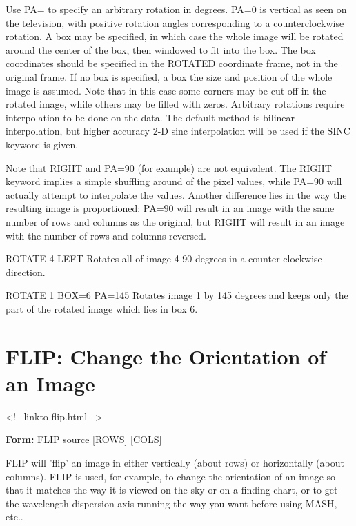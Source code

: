 Use PA= to specify an arbitrary rotation in degrees.  PA=0 is vertical as
seen on the television, with positive rotation angles corresponding to a
counterclockwise rotation. A box may be specified, in which case the whole
image will be rotated around the center of the box, then windowed to fit
into the box.  The box coordinates should be specified in the ROTATED
coordinate frame, not in the original frame. If no box is specified, a box
the size and position of the whole image is assumed.  Note that in this
case some corners may be cut off in the rotated image, while others may be
filled with zeros. Arbitrary rotations require interpolation to be done on
the data. The default method is bilinear interpolation, but higher accuracy
2-D sinc interpolation will be used if the SINC keyword is given.

Note that RIGHT and PA=90 (for example) are not equivalent.  The RIGHT
keyword implies a simple shuffling around of the pixel values, while PA=90
will actually attempt to interpolate the values.  Another difference lies
in the way the resulting image is proportioned: PA=90 will result in an
image with the same number of rows and columns as the original, but RIGHT
will result in an image with the number of rows and columns reversed.
\begin{example}
  \item[ROTATE 4 LEFT\hfill]{Rotates all of image 4 90 degrees
       in a counter-clockwise direction.}
  \item[ROTATE 1 BOX=6 PA=145\hfill]{Rotates image 1 by 145 degrees and
       keeps only the part of the rotated image which lies in box 6.}
\end{example}

\section{FLIP: Change the Orientation of an Image}
\begin{rawhtml}
<!-- linkto flip.html -->
\end{rawhtml}

\begin{command}
  \item[\textbf{Form: }FLIP source {[ROWS]} {[COLS]}\hfill]{}
\end{command}

FLIP will 'flip' an image in either vertically (about rows) or horizontally
(about columns).  FLIP is used, for example, to change the orientation of
an image so that it matches the way it is viewed on the sky or on a finding
chart, or to get the wavelength dispersion axis running the way you want
before using MASH, etc..

